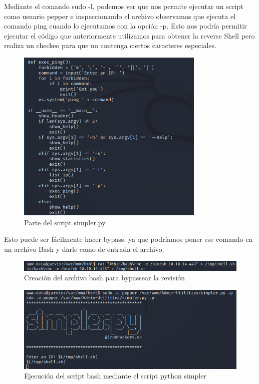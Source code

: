 \documentclass{article}
\begin{document}
Mediante el comando sudo -l, podemos ver que nos permite ejecutar un script como usuario pepper e inspeccionando el archivo observamos que ejecuta el comando ping cuando lo ejecutamos con la opción -p. Esto nos podría permitir ejecutar el código que anteriormente utilizamos para obtener la reverse Shell pero realiza un checkeo para que no contenga ciertos caracteres especiales. 
\begin{figure}[H]
	\center
	\includegraphics[width=0.8\textwidth]{images/jarvis/13.png}
	\caption{Parte del script simpler.py}
\end{figure}

Esto puede ser fácilmente hacer bypass, ya que podríamos poner ese comando en un archivo Bash y darle como de entrada el archivo.
\begin{figure}[H]
	\center
	\includegraphics[width=\textwidth]{images/jarvis/14.png}
	\caption{Creación del archivo bash para bypassear la revisión}
\end{figure}\begin{figure}[H]
	\center
	\includegraphics[width=\textwidth]{images/jarvis/15.png}
	\caption{Ejecución del script bash mediante el script python simpler}
\end{figure}
\end{document}
